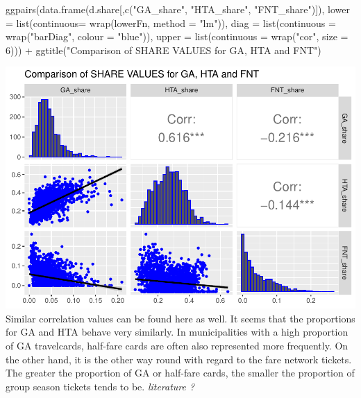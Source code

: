 \documentclass[
]{article}
\newenvironment{Shaded}{\begin{snugshade}}{\end{snugshade}}
\newcommand{\AttributeTok}[1]{\textcolor[rgb]{0.77,0.63,0.00}{#1}}
\newcommand{\DecValTok}[1]{\textcolor[rgb]{0.00,0.00,0.81}{#1}}
\newcommand{\FunctionTok}[1]{\textcolor[rgb]{0.00,0.00,0.00}{#1}}
\newcommand{\NormalTok}[1]{#1}
\newcommand{\SpecialCharTok}[1]{\textcolor[rgb]{0.00,0.00,0.00}{#1}}
\newcommand{\StringTok}[1]{\textcolor[rgb]{0.31,0.60,0.02}{#1}}
\begin{document}
\begin{Shaded}
\begin{Highlighting}[]
\FunctionTok{ggpairs}\NormalTok{(}\FunctionTok{data.frame}\NormalTok{(d.share[,}\FunctionTok{c}\NormalTok{(}\StringTok{"GA\_share"}\NormalTok{, }\StringTok{"HTA\_share"}\NormalTok{, }\StringTok{"FNT\_share"}\NormalTok{)]),}
        \AttributeTok{lower =} \FunctionTok{list}\NormalTok{(}\AttributeTok{continuous=} \FunctionTok{wrap}\NormalTok{(lowerFn, }\AttributeTok{method =} \StringTok{"lm"}\NormalTok{)),}
        \AttributeTok{diag =} \FunctionTok{list}\NormalTok{(}\AttributeTok{continuous =} \FunctionTok{wrap}\NormalTok{(}\StringTok{"barDiag"}\NormalTok{, }\AttributeTok{colour =} \StringTok{"blue"}\NormalTok{)),}
        \AttributeTok{upper =} \FunctionTok{list}\NormalTok{(}\AttributeTok{continuous =} \FunctionTok{wrap}\NormalTok{(}\StringTok{"cor"}\NormalTok{, }\AttributeTok{size =} \DecValTok{6}\NormalTok{))) }\SpecialCharTok{+} 
  \FunctionTok{ggtitle}\NormalTok{(}\StringTok{"Comparison of SHARE VALUES for GA, HTA and FNT"}\NormalTok{) }
\end{Highlighting}
\end{Shaded}

\includegraphics{Influence_factors_files/figure-latex/2.33_share_comparison-1.pdf}
Similar correlation values can be found here as well. It seems that the
proportions for GA and HTA behave very similarly. In municipalities with
a high proportion of GA travelcards, half-fare cards are often also
represented more frequently. On the other hand, it is the other way
round with regard to the fare network tickets. The greater the
proportion of GA or half-fare cards, the smaller the proportion of group
season tickets tends to be. \emph{literature ?}
\end{document}
